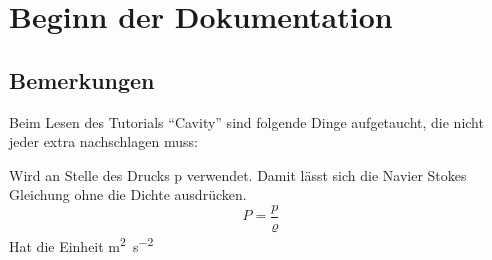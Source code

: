 \chapter{Beginn der Dokumentation}

\section{Bemerkungen}

Beim Lesen des Tutorials "`Cavity"' sind folgende Dinge aufgetaucht, die nicht jeder extra nachschlagen muss:\\

\begin{defi}
	Wird an Stelle des Drucks p verwendet. Damit lässt sich die Navier Stokes Gleichung ohne die Dichte ausdrücken.
	\[P = \frac{p}{\varrho}\]
	Hat die Einheit \si{\square\meter\per\square\second}
\end{defi}


